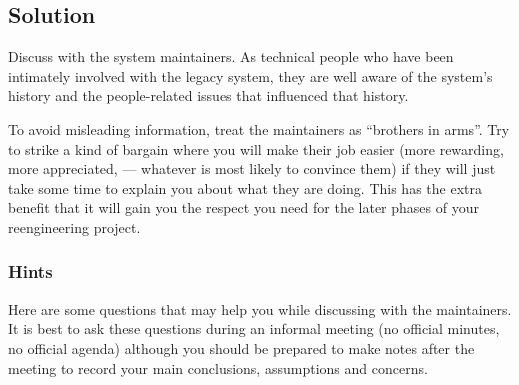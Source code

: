 \documentclass[a4paper,10pt,twoside]{book}
\begin{document}
\subsection*{Solution}

Discuss with the system maintainers. As technical people who have been intimately involved with the legacy system, they are well aware of the system's history and the people-related issues that influenced that history.

To avoid misleading information, treat the maintainers as ``brothers in arms''. Try to strike a kind of bargain where you will make their job easier (more rewarding, more appreciated, --- whatever is most likely to convince them) if they will just take some time to explain you about what they are doing. This has the extra benefit that it will gain you the respect you need for the later phases of your reengineering project.

\subsubsection*{Hints}

Here are some questions that may help you while discussing with the maintainers. It is best to ask these questions during an informal meeting (no official minutes, no official agenda) although you should be prepared to make notes after the meeting to record your main conclusions, assumptions and concerns.
\end{document}
